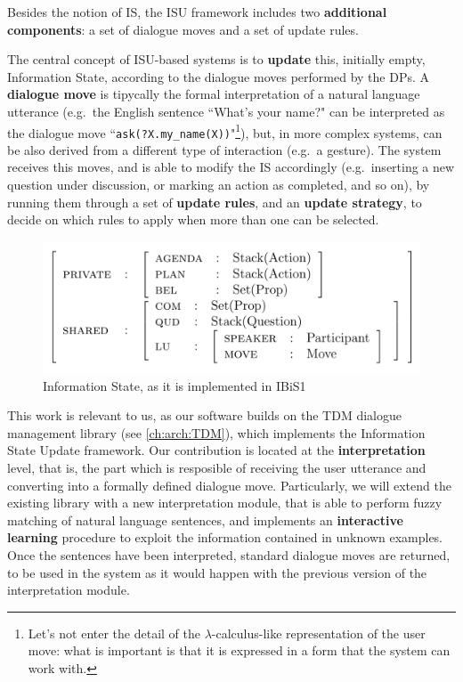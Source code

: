 Besides the notion of IS, the ISU framework includes two \textbf{additional components}: a set of dialogue moves and a set of update rules.

The central concept of ISU-based systems is to \textbf{update} this, initially empty, Information State, according to the dialogue moves performed by the DPs. A \textbf{dialogue move} is tipycally the formal interpretation of a natural language utterance (e.g.\ the English sentence ``What's your name?" can be interpreted as the dialogue move ``\texttt{ask(?X.my\_name(X))}"\footnote{Let's not enter the detail of the $\lambda$-calculus-like representation of the user move: what is important is that it is expressed in a form that the system can work with.}), but, in more complex systems, can be also derived from a different type of interaction (e.g.\ a gesture). The system receives this moves, and is able to modify the IS accordingly (e.g.\ inserting a new question under discussion, or marking an action as completed, and so on), by running them through a set of \textbf{update rules}, and an \textbf{update strategy}, to decide on which rules to apply when more than one can be selected.

\begin{figure}
	\centering
	\includegraphics{Pictures/ibis1_is.png}
	\caption{Information State, as it is implemented in IBiS1}
	\label{ch:rw:ds:isu:ibisis}
\end{figure}

This work is relevant to us, as our software builds on the TDM dialogue management library (see \ref{ch:arch:TDM}), which implements the Information State Update framework. Our contribution is located at the \textbf{interpretation} level, that is, the part which is resposible of receiving the user utterance and converting into a formally defined dialogue move. Particularly, we will extend the existing library with a new interpretation module, that is able to perform fuzzy matching of natural language sentences, and implements an \textbf{interactive learning} procedure to exploit the information contained in unknown examples. Once the sentences have been interpreted, standard dialogue moves are returned, to be used in the system as it would happen with the previous version of the interpretation module.

